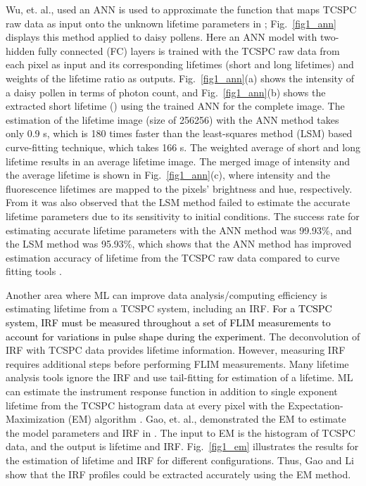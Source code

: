 \documentclass[12pt]{iopart}
\newcommand{\cc}[1]{\textcolor{black}{#1}}
\begin{document}
Wu, et. al., used an ANN is used to approximate the function that maps TCSPC raw data as input onto the unknown lifetime parameters in \cite{ann}; Fig.~\ref{fig1_ann} displays this method applied to daisy pollens. Here an ANN model with two-hidden fully connected (FC) layers is trained with the TCSPC raw data from each pixel as input and its corresponding lifetimes (short and long lifetimes) and weights of the lifetime ratio as outputs. Fig.~\ref{fig1_ann}(a) shows the intensity of a daisy pollen in terms of photon count, and Fig.~\ref{fig1_ann}(b) shows the extracted short lifetime () using the trained ANN for the complete image. The estimation of the lifetime image (size of 256256) with the ANN method takes only 0.9 s, which is 180 times faster than the least-squares method (LSM) based curve-fitting technique, which takes 166 s. The weighted average of short and long lifetime results in an average lifetime image. The merged image of intensity and the average lifetime is shown in Fig.~\ref{fig1_ann}(c), where intensity and the fluorescence lifetimes are mapped to the pixels' brightness and hue, respectively. From \cite{ann} it was also observed that the LSM method failed to estimate the accurate lifetime parameters due to its sensitivity to initial conditions. The success rate for estimating accurate lifetime parameters with the ANN method was 99.93\%, and the LSM method was 95.93\%, which shows that the ANN method has improved estimation accuracy of lifetime from the TCSPC raw data compared to curve fitting tools \cite{ann}.

Another area where ML can improve data analysis/computing efficiency is estimating lifetime from a TCSPC system, including an IRF. \cc{For a TCSPC system, IRF must be measured throughout a set of FLIM measurements to account for variations in pulse shape during the experiment.} The deconvolution of IRF with TCSPC data provides lifetime information. However, measuring IRF requires additional steps before performing FLIM measurements. Many lifetime analysis tools ignore the IRF and use tail-fitting for estimation of a lifetime. ML can estimate the instrument response function  in addition to single exponent lifetime  from the TCSPC histogram data at every pixel with the Expectation-Maximization (EM) algorithm \cite{em}. Gao, et. al., demonstrated the EM to estimate the model parameters  and IRF in \cite{em}. The input to EM is the histogram of TCSPC data, and the output is lifetime and IRF. Fig.~\ref{fig1_em} illustrates the results for the estimation of lifetime and IRF for different configurations. Thus, Gao and Li \cite{em} show that the IRF profiles could be extracted accurately using the EM method.
\end{document}
